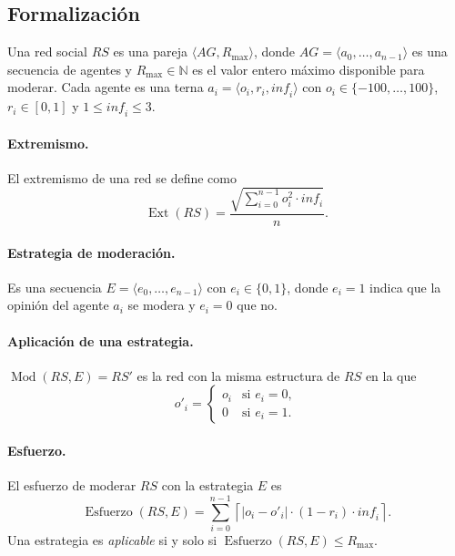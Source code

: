 \documentclass[11pt,letterpaper]{article}
\newcommand{\RS}{\mathit{RS}}
\newcommand{\Rmax}{R_{\max}}
\newcommand{\Ext}{\operatorname{Ext}}
\newcommand{\Esf}{\operatorname{Esfuerzo}}
\newcommand{\Mod}{\operatorname{Mod}}
\begin{document}
\subsection{Formalización}

Una red social $\RS$ es una pareja $\langle AG, \Rmax \rangle$, donde
$AG = \langle a_0, \dots, a_{n-1} \rangle$ es una secuencia de agentes y
$\Rmax \in \mathbb{N}$ es el valor entero máximo disponible para moderar.
Cada agente es una terna
$a_i = \langle o_i, r_i, \mathit{inf}_i \rangle$ con
$o_i \in \{-100,\dots,100\}$, $r_i \in [0,1]$ y $1 \le \mathit{inf}_i \le 3$.

\paragraph{Extremismo.} El extremismo de una red se define como
\begin{equation}
  \Ext(\RS) = \frac{\sqrt{\sum_{i=0}^{n-1} o_i^2 \cdot \mathit{inf}_i}}{n}.
  \label{eq:ext}
\end{equation}

\paragraph{Estrategia de moderación.} Es una secuencia
$E = \langle e_0, \dots, e_{n-1} \rangle$ con $e_i \in \{0,1\}$, donde
$e_i = 1$ indica que la opinión del agente $a_i$ se modera y $e_i = 0$ que no.

\paragraph{Aplicación de una estrategia.} $\Mod(\RS, E) = \RS'$ es la red con
la misma estructura de $\RS$ en la que
\[
  o'_i =
  \begin{cases}
    o_i & \text{si } e_i = 0,\\
    0   & \text{si } e_i = 1.
  \end{cases}
\]

\paragraph{Esfuerzo.} El esfuerzo de moderar $\RS$ con la estrategia $E$ es
\begin{equation}
  \Esf(\RS, E) = \sum_{i=0}^{n-1}
  \left\lceil |o_i - o'_i| \cdot (1 - r_i) \cdot \mathit{inf}_i \right\rceil .
  \label{eq:esf}
\end{equation}
Una estrategia es \emph{aplicable} si y solo si $\Esf(\RS, E) \le \Rmax$.
\end{document}
